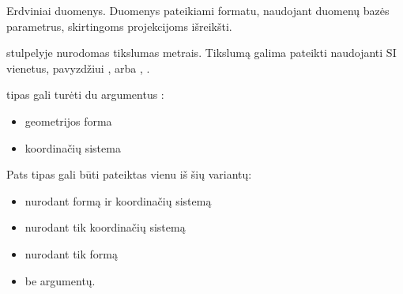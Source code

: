 \documentclass[letterpaper,10pt,lithuanian]{sphinxmanual}
\begin{document}
\begin{fulllineitems}
\label{\detokenize{tipai:type.geometry}}
\pysigstartsignatures
\pysigline
{}
\pysigstopsignatures
\sphinxAtStartPar
Erdviniai duomenys. Duomenys pateikiami  formatu, naudojant 
duomenų bazės parametrus, skirtingoms projekcijoms išreikšti.

\sphinxAtStartPar
{\hyperref[\detokenize{dimensijos:property.ref}]{}} stulpelyje nurodomas tikslumas metrais. Tikslumą
galima pateikti naudojanti SI vienetus, pavyzdžiui ,  arba ,
.

\sphinxAtStartPar
{} tipas gali turėti du argumentus :
\begin{itemize}
\item {} 
\sphinxAtStartPar
{} \sphinxhyphen{} geometrijos forma

\item {} 
\sphinxAtStartPar
{} \sphinxhyphen{} koordinačių sistema

\end{itemize}

\sphinxAtStartPar
Pats tipas gali būti pateiktas vienu iš šių variantų:
\begin{itemize}
\item {} 
\sphinxAtStartPar
{} \sphinxhyphen{} nurodant formą ir koordinačių sistemą

\item {} 
\sphinxAtStartPar
{} \sphinxhyphen{} nurodant tik koordinačių sistemą

\item {} 
\sphinxAtStartPar
{} \sphinxhyphen{} nurodant tik formą

\item {} 
\sphinxAtStartPar
{} \sphinxhyphen{} be argumentų.

\end{itemize}


\end{fulllineitems}
\end{document}
